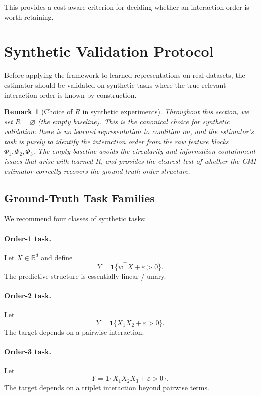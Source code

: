 \documentclass[11pt]{article}
\newtheorem{remark}{Remark}
\newcommand{\R}{\mathbb{R}}
\newcommand{\1}{\mathbf{1}}
\begin{document}
This provides a cost-aware criterion for deciding whether an interaction order is worth retaining.

\section{Synthetic Validation Protocol}
\label{sec:synthetic}

Before applying the framework to learned representations on real datasets, the estimator should be
validated on synthetic tasks where the true relevant interaction order is known by construction.

\begin{remark}[Choice of $R$ in synthetic experiments]
Throughout this section, we set $R = \varnothing$ (the empty baseline).
This is the canonical choice for synthetic validation: there is no learned representation to
condition on, and the estimator's task is purely to identify the interaction order from the
raw feature blocks $\Phi_1, \Phi_2, \Phi_3$.
The empty baseline avoids the circularity and information-containment issues that arise with
learned $R$, and provides the clearest test of whether the CMI estimator correctly recovers
the ground-truth order structure.
\end{remark}

\subsection{Ground-Truth Task Families}

We recommend four classes of synthetic tasks:

\paragraph{Order-1 task.}
Let $X \in \R^d$ and define
\[
Y = \1\{w^\top X + \varepsilon > 0\}.
\]
The predictive structure is essentially linear / unary.

\paragraph{Order-2 task.}
Let
\[
Y = \1\{X_1 X_2 + \varepsilon > 0\}.
\]
The target depends on a pairwise interaction.

\paragraph{Order-3 task.}
Let
\[
Y = \1\{X_1 X_2 X_3 + \varepsilon > 0\}.
\]
The target depends on a triplet interaction beyond pairwise terms.
\end{document}
